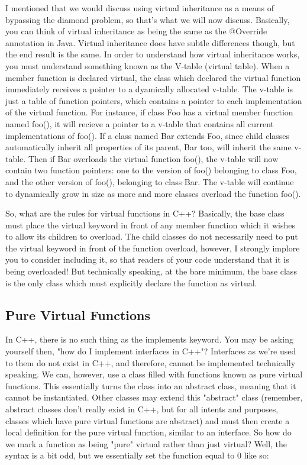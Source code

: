 \documentclass{article}
\begin{document}
I mentioned that we would discuss using virtual inheritance as a means of bypassing the diamond problem, so
that's what we will now discuss. Basically, you can think of virtual inheritance as being the same as the
@Override annotation in Java. Virtual inheritance does have subtle differences though, but the end result is the
same. In order to understand how virtual inheritance works, you must understand something known as the V-table
(virtual table). When a member function is declared virtual, the class which declared the virtual function
immediately receives a pointer to a dyamically allocated v-table. The v-table is just a table of function
pointers, which contains a pointer to each implementation of the virtual function. For instance, if class Foo
has a virtual member function named foo(), it will recieve a pointer to a v-table that contains all current
implementations of foo(). If a class named Bar extends Foo, since child classes automatically inherit all
properties of its parent, Bar too, will inherit the same v-table. Then if Bar overloads the virtual function
foo(), the v-table will now contain two function pointers: one to the version of foo() belonging to class Foo,
and the other version of foo(), belonging to class Bar. The v-table will continue to dynamically grow in size
as more and more classes overload the function foo().

So, what are the rules for virtual functions in C++? Basically, the base class must place the virtual keyword
in front of any member function which it wishes to allow its children to overload. The child classes do not
necessarily need to put the virtual keyword in front of the function overload, however, I strongly implore you
to consider including it, so that readers of your code understand that it is being overloaded! But technically
speaking, at the bare minimum, the base class is the only class which must explicitly declare the function as
virtual.

\subsection{Pure Virtual Functions}

In C++, there is no such thing as the implements keyword. You may be asking yourself then, "how do I implement
interfaces in C++"? Interfaces as we’re used to them do not exist in C++, and therefore, cannot be implemented
technically speaking. We can, however, use a class filled with functions known as pure virtual functions. This
essentially turns the class into an abstract class, meaning that it cannot be instantiated. Other classes may
extend this "abstract" class (remember, abstract classes don't really exist in C++, but for all intents and
purposes, classes which have pure virtual functions are abstract) and must then create a local definition for
the pure virtual function, similar to an interface. So how do we mark a function as being "pure" virtual
rather than just virtual? Well, the syntax is a bit odd, but we essentially set the function equal to 0 like
so:
\end{document}
